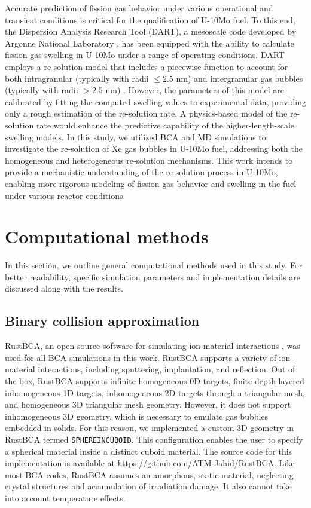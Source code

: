 \documentclass[review]{elsarticle}
\begin{document}
Accurate prediction of fission gas behavior
under various operational and transient conditions is critical
for the qualification of U-10Mo fuel.
To this end, the Dispersion Analysis Research Tool (DART),
a mesoscale code developed by Argonne National Laboratory \cite{ye2023},
has been equipped with the ability to calculate
fission gas swelling in U-10Mo under a range of operating conditions.
DART employs a re-solution model
that includes a piecewise function to account for
both intragranular (typically with radii $\le 2.5$ nm)
and intergranular gas bubbles (typically with radii $> 2.5$ nm) \cite{kim2008}.
However, the parameters of this model are calibrated
by fitting the computed swelling values to experimental data,
providing only a rough estimation of the re-solution rate.
A physics-based model of the re-solution rate would enhance
the predictive capability of the higher-length-scale swelling models.
In this study, we utilized BCA and MD simulations
to investigate the re-solution of Xe gas bubbles in U-10Mo fuel,
addressing both the homogeneous and heterogeneous re-solution mechanisms.
This work intends to provide
a mechanistic understanding of the re-solution process in U-10Mo,
enabling more rigorous modeling of fission gas behavior and swelling
in the fuel under various reactor conditions.


\section{Computational methods}

In this section, we outline general computational methods used in this study.
For better readability,
specific simulation parameters and implementation details
are discussed along with the results.

\subsection{Binary collision approximation}

RustBCA, an open-source software for simulating ion-material interactions
\cite{drobny2021},
was used for all BCA simulations in this work.
RustBCA supports a variety of ion-material interactions,
including sputtering, implantation, and reflection.
Out of the box, RustBCA supports infinite homogeneous 0D targets,
finite-depth layered inhomogeneous 1D targets,
inhomogeneous 2D targets through a triangular mesh,
and homogeneous 3D triangular mesh geometry.
However, it does not support inhomogeneous 3D geometry,
which is necessary to emulate gas bubbles embedded in solids.
For this reason, we implemented a custom 3D geometry in RustBCA
termed \texttt{SPHEREINCUBOID}.
This configuration enables the user to specify
a spherical material inside a distinct cuboid material.
The source code for this implementation is available
at \url{https://github.com/ATM-Jahid/RustBCA}.
Like most BCA codes, RustBCA assumes an amorphous, static material,
neglecting crystal structures and accumulation of irradiation damage.
It also cannot take into account temperature effects.
\end{document}
